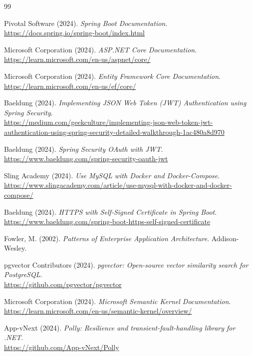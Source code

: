 \begin{thebibliography}{99}


Pivotal Software (2024).
\textit{Spring Boot Documentation}.\\
\url{https://docs.spring.io/spring-boot/index.html}

Microsoft Corporation (2024).
\textit{ASP.NET Core Documentation}.\\
\url{https://learn.microsoft.com/en-us/aspnet/core/}

Microsoft Corporation (2024).
\textit{Entity Framework Core Documentation}.\\
\url{https://learn.microsoft.com/en-us/ef/core/}

Baeldung (2024).
\textit{Implementing JSON Web Token (JWT) Authentication using Spring Security}.\\
\url{https://medium.com/geekculture/implementing-json-web-token-jwt-authentication-using-spring-security-detailed-walkthrough-1ac480a8d970}

Baeldung (2024).
\textit{Spring Security OAuth with JWT}.\\
\url{https://www.baeldung.com/spring-security-oauth-jwt}

Sling Academy (2024).
\textit{Use MySQL with Docker and Docker-Compose}.\\
\url{https://www.slingacademy.com/article/use-mysql-with-docker-and-docker-compose/}

Baeldung (2024).
\textit{HTTPS with Self-Signed Certificate in Spring Boot}.\\
\url{https://www.baeldung.com/spring-boot-https-self-signed-certificate}

Fowler, M. (2002).
\textit{Patterns of Enterprise Application Architecture}. Addison-Wesley.

pgvector Contributors (2024).
\textit{pgvector: Open-source vector similarity search for PostgreSQL}.\\
\url{https://github.com/pgvector/pgvector}

Microsoft Corporation (2024).
\textit{Microsoft Semantic Kernel Documentation}.\\
\url{https://learn.microsoft.com/en-us/semantic-kernel/overview/}

App-vNext (2024).
\textit{Polly: Resilience and transient-fault-handling library for .NET}.\\
\url{https://github.com/App-vNext/Polly}


\end{thebibliography}
